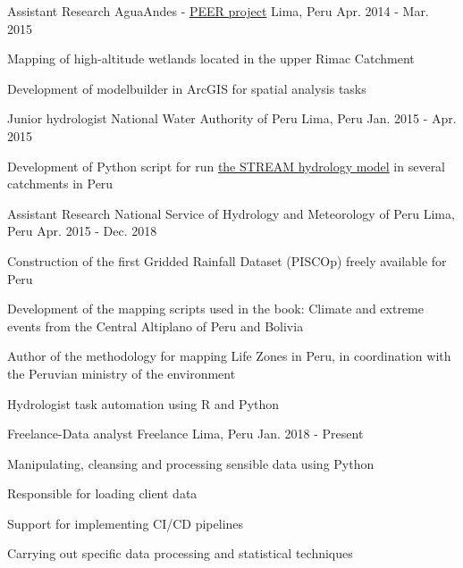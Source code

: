 \begin{cventries}
  \cventry
    {Assistant Research}
    {AguaAndes - \href{http://sites.nationalacademies.org/pga/PEER/PEERscience/PGA_084063}{PEER project}}
    {Lima, Peru}
    {Apr. 2014 - Mar. 2015}
    {
      \begin{cvitems}
        \item {Mapping of high-altitude wetlands located in the upper Rimac Catchment}
        \item {Development of modelbuilder in ArcGIS for spatial analysis tasks}
      \end{cvitems}
    }
  \cventry
    {Junior hydrologist}
    {National Water Authority of Peru}
    {Lima, Peru}
    {Jan. 2015 - Apr. 2015}
    {
      \begin{cvitems}
        \item {Development of Python script for run \href{https://pypi.org/project/pystream-model/}{the STREAM hydrology model} in several catchments in Peru}
      \end{cvitems}
    }
  \cventry
    {Assistant Research}
    {National Service of Hydrology and Meteorology of Peru}
    {Lima, Peru}
    {Apr. 2015 - Dec. 2018}
    {
      \begin{cvitems}
        \item {Construction of the first Gridded Rainfall Dataset (PISCOp) freely available for Peru}
        \item {Development of the mapping scripts used in the book: Climate and extreme events from the Central Altiplano of Peru and Bolivia}
        \item {Author of the methodology for mapping Life Zones in Peru, in coordination with the Peruvian ministry of the environment}
        \item {Hydrologist task automation using R and Python}
      \end{cvitems} 
    }
  \cventry
    {Freelance-Data analyst}
    {Freelance}
    {Lima, Peru}
    {Jan. 2018 - Present}
    {
      \begin{cvitems}
        \item {Manipulating, cleansing and processing sensible data using Python}
        \item {Responsible for loading client data}
        \item {Support for implementing CI/CD pipelines}
        \item {Carrying out specific data processing and statistical techniques}
      \end{cvitems} 
    }
\end{cventries}
